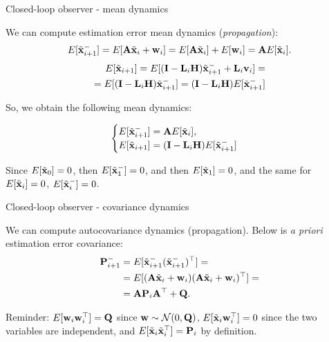 \documentclass{beamer}
\newcommand{\btil}[1] {\Tilde{\mathbf{#1}}}
\begin{document}
\begin{frame}{Closed-loop observer - mean dynamics}
	\begin{flushleft}
		
		We can compute estimation error mean dynamics (\emph{propagation}):
				\begin{align*}
		E[\btil{x}_{i+1}^-] = 
		E[\bo{A} \btil{x}_i + \bo{w}_i] = 
		E[\bo{A} \btil{x}_i] + E[\bo{w}_i]  =
		\bo{A}E[\btil{x}_i].
				\end{align*}	
				\begin{align*}
		E[\btil{x}_{i+1}] = 
		E[(\bo{I} - \bo{L}_i \bo{H}) \btil{x}_{i+1}^- + \bo{L}_i\bo{v}_i] =\\
		=E[(\bo{I} - \bo{L}_i \bo{H}) \btil{x}_{i+1}^-]
		= 
		(\bo{I} - \bo{L}_i \bo{H}) E[\btil{x}_{i+1}^-]
				\end{align*}				
		
		So, we obtain the following mean dynamics:
		
				\begin{equation}
						\begin{cases}
								E[\btil{x}_{i+1}^-] = \bo{A} E[\btil{x}_i], \\
								E[\btil{x}_{i+1}] = (\bo{I} - \bo{L}_i \bo{H}) E[\btil{x}_{i+1}^-]
							\end{cases}
					\end{equation}		
		
		Since $E[\btil{x}_0] = 0$, then $E[\btil{x}_1^-] = 0$, and then $E[\btil{x}_1] = 0$, and the same for $E[\btil{x}_i] = 0$, $E[\btil{x}_i^-] = 0$.
		
	\end{flushleft}
\end{frame}



\begin{frame}{Closed-loop observer - covariance dynamics}
	\begin{flushleft}
		
		We can compute autocovariance dynamics (propagation). Below is \emph{a priori} estimation error covariance:
		\begin{align*}
				\bo{P}_{i+1}^- 
				&= E[\btil{x}_{i+1}^- (\btil{x}_{i+1}^-)\T] = \\
				&= E[ (\bo{A} \btil{x}_i + \bo{w}_i) (\bo{A} \btil{x}_i + \bo{w}_i)\T] = \\
				&= \bo{A} \bo{P}_i \bo{A}\T +\bo{Q}.
		\end{align*}		
	
		\bigskip
	
		\textcolor{mydarkgray}{Reminder: $E[\mathbf{w}_i \mathbf{w}_i^\top] = \mathbf{Q}$ since $\mathbf{w} \sim \mathcal{N} (0, \mathbf{Q})$, $E[\btil{x}_i \bo{w}_i\T] = 0$ since the two variables are independent, and $E[\btil{x}_i \btil{x}_i\T] = \bo{P}_i$ by definition.}
		
		
	\end{flushleft}
\end{frame}
\end{document}
